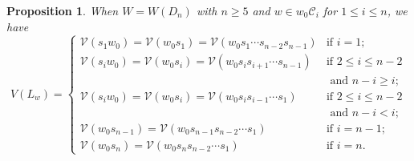 \documentclass[11pt, reqno]{amsart}
\newtheorem{prop}[Thm]{Proposition}
\theoremstyle{definition}
\numberwithin{equation}{section}
\begin{document}
\begin{prop}
    When $W=W(D_n)$ with $n\geq 5$ and $w\in w_0\mathcal{C}_i$ for $1\leq i\leq n$, we have 
    \[{
V(L_w)=
\begin{cases}
\mathcal V(s_1w_0)=\mathcal V(w_0s_1)=\mathcal V(w_0s_1\cdots s_{n-2}s_{n-1}) & \text{if~}i=1;\\
\mathcal V(s_iw_0)=\mathcal V(w_0s_i)=\mathcal V(w_0s_is_{i+1}\cdots s_{n-1})  & \text{if~} 2\leq i\leq n-2\\
&\text{~and~}n-i\geq i;\\
\mathcal V(s_iw_0)=\mathcal V(w_0s_i)=\mathcal V(w_0s_is_{i-1}\cdots s_{1})  & \text{if~} 2\leq i\leq n-2\\
&\text{~and~}n-i< i;\\
\mathcal V(w_0s_{n-1})= \mathcal V(w_0s_{n-1}s_{n-2}\cdots s_1)& \text{if~}i=n-1;\\
\mathcal V(w_0s_{n})=\mathcal V(w_0s_{n}s_{n-2}\cdots s_1) & \text{if~}i=n.
\end{cases}}
\]


\end{prop}
\end{document}

